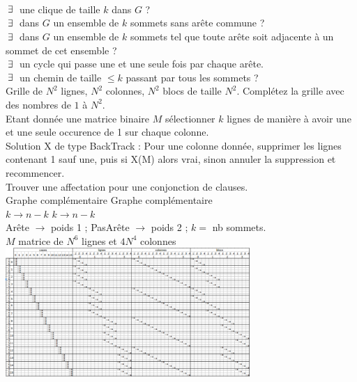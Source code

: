 \documentclass[a4paper,11pt]{article}
\begin{document}
 \\
 \\
 \\
 $\: \exists \:$ une clique de taille $k$ dans $G$ ?\\
 $\: \exists \:$ dans $G$ un ensemble de $k$ sommets sans arête commune ?\\
 $\: \exists \:$ dans $G$ un ensemble de $k$ sommets tel que toute arête soit adjacente à un sommet de cet ensemble ? \\
 $\: \exists \:$ un cycle qui passe une et une seule fois par chaque arête. \\
 $\: \exists \:$ un chemin de taille $\leq k$ passant par tous les sommets ? \\
 Grille de $N^2$ lignes, $N^2$ colonnes, $N^2$ blocs de taille $N^2$. Complétez la grille avec des nombres de $1$ à $N^2$. \\
 Etant donnée une matrice binaire $M$ sélectionner $k$ lignes de manière à avoir une et une seule occurence de 1 sur chaque colonne. \\
Solution X de type BackTrack : Pour une colonne donnée, supprimer les lignes contenant 1 sauf une, puis si X(M) alors vrai, sinon annuler la suppression et recommencer. \\
 Trouver une affectation pour une conjonction de clauses. \\
 Graphe complémentaire 
 Graphe complémentaire \\
 $k \rightarrow n-k$ 
 $k \rightarrow n-k$ \\
 Arête $\rightarrow$ poids 1 ; PasArête $\rightarrow$ poids 2 ; $k = $ nb sommets. \\
 $M$ matrice de $N^6$ lignes et $4N^4$ colonnes \\
\includegraphics[width=350px]{../Images/04_sudoku_couv.pdf}
\end{document}
